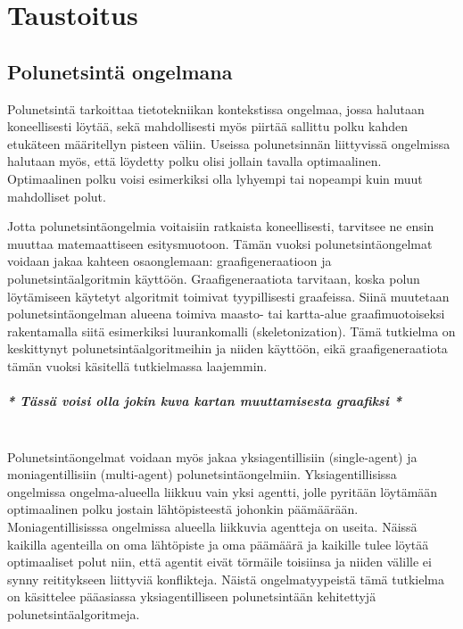 \chapter{Taustoitus} \label{Taustoitus}

\section{Polunetsintä ongelmana}\label{pOngelmana}
Polunetsintä tarkoittaa tietotekniikan kontekstissa ongelmaa, jossa halutaan 
koneellisesti löytää, sekä mahdollisesti myös piirtää sallittu polku kahden 
etukäteen määritellyn pisteen väliin. Useissa polunetsinnän liittyvissä 
ongelmissa halutaan myös, että löydetty polku olisi jollain tavalla 
optimaalinen. Optimaalinen polku voisi esimerkiksi olla lyhyempi tai nopeampi 
kuin muut mahdolliset polut. \cite{MathewAndMalathy} \par
	Jotta polunetsintäongelmia voitaisiin ratkaista koneellisesti, 
tarvitsee ne ensin muuttaa matemaattiseen esitysmuotoon. Tämän vuoksi 
polunetsintäongelmat voidaan jakaa kahteen osaonglemaan: graafigeneraatioon 
ja polunetsintäalgoritmin käyttöön. Graafigeneraatiota tarvitaan, koska polun 
löytämiseen käytetyt algoritmit toimivat tyypillisesti graafeissa. Siinä 
muutetaan polunetsintäongelman alueena toimiva maasto- tai kartta-alue 
graafimuotoiseksi rakentamalla siitä esimerkiksi luurankomalli 
(skeletonization). \cite{ACMHindawi} Tämä tutkielma on keskittynyt 
polunetsintäalgoritmeihin ja niiden käyttöön, eikä graafigeneraatiota tämän 
vuoksi käsitellä tutkielmassa laajemmin.
\\
\paragraph{\textit{* Tässä voisi olla jokin kuva kartan muuttamisesta graafiksi *}}\mbox{}
\\
	Polunetsintäongelmat voidaan myös jakaa yksiagentillisiin 
(single-agent) ja moniagentillisiin (multi-agent) polunetsintäongelmiin. 
Yksiagentillisissa ongelmissa ongelma-alueella liikkuu vain yksi agentti, 
jolle pyritään löytämään optimaalinen polku jostain lähtöpisteestä johonkin 
päämäärään. Moniagentillisisssa ongelmissa alueella liikkuvia agentteja on 
useita. Näissä kaikilla agenteilla on oma lähtöpiste ja oma päämäärä ja 
kaikille tulee löytää optimaaliset polut niin, että agentit eivät törmäile 
toisiinsa ja niiden välille ei synny reititykseen liittyviä konflikteja. 
\cite{arXivMAPF} Näistä ongelmatyypeistä tämä tutkielma on käsittelee 
pääasiassa yksiagentilliseen polunetsintään kehitettyjä 
polunetsintäalgoritmeja.


